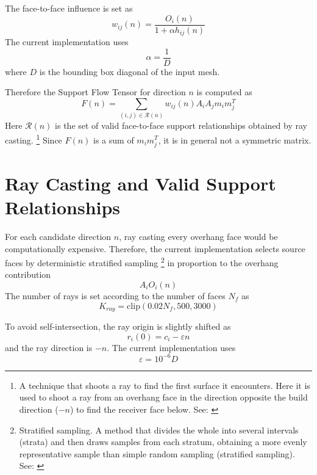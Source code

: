 \documentclass[11pt,a4paper]{article}
\begin{document}
The face-to-face influence is set as
\begin{equation}
w_{ij}(n)
=
\frac{O_i(n)}{1+\alpha h_{ij}(n)}
\end{equation}
The current implementation uses
\begin{equation}
\alpha = \frac{1}{D}
\end{equation}
where $D$ is the bounding box diagonal of the input mesh.

Therefore the Support Flow Tensor for direction $n$ is computed as
\begin{equation}
F(n)
=
\sum_{(i,j)\in \mathcal{R}(n)}
w_{ij}(n)
A_iA_j
m_i m_j^T
\end{equation}
Here $\mathcal{R}(n)$ is the set of valid face-to-face support relationships obtained by ray casting.%
\footnote{A technique that shoots a ray to find the first surface it encounters. Here it is used to shoot a ray
from an overhang face in the direction opposite the build direction ($-n$) to find the receiver face below.
See: \cite{roth1982}}
Since $F(n)$ is a sum of $m_i m_j^T$, it is in general not a symmetric matrix.

\section{Ray Casting and Valid Support Relationships}

For each candidate direction $n$, ray casting every overhang face would be computationally expensive.
Therefore, the current implementation selects source faces by deterministic stratified sampling%
\footnote{Stratified sampling. A method that divides the whole into several intervals (strata) and then draws samples from each stratum,
obtaining a more evenly representative sample than simple random sampling (stratified sampling). See: \cite{cochran1977}}
in proportion to the overhang contribution
\begin{equation}
A_iO_i(n)
\end{equation}
The number of rays is set according to the number of faces $N_f$ as
\begin{equation}
K_{ray}
=
\mathrm{clip}(0.02N_f,500,3000)
\end{equation}

To avoid self-intersection, the ray origin is slightly shifted as
\begin{equation}
r_i(0)=c_i-\varepsilon n
\end{equation}
and the ray direction is $-n$.
The current implementation uses
\begin{equation}
\varepsilon = 10^{-6}D
\end{equation}
\end{document}
